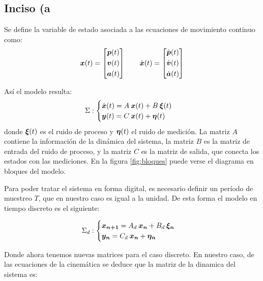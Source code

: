 \subsection{Inciso (a}
	Se define la variable de estado asociada a las ecuaciones de movimiento continuo como:
		\begin{equation*}
			\vect{x}(t) = \begin{bmatrix} \vect{p}(t) \\[0.3em] \vect{v}(t) \\[0.3em] \vect{a}(t) \end{bmatrix} \qquad%
			\dot{\vect{x}}(t) = \begin{bmatrix} \dot{\vect{p}}(t) \\[0.3em] \dot{\vect{v}}(t) \\[0.3em] \dot{\vect{a}}(t) \end{bmatrix}
		\end{equation*}

	Así el modelo resulta:
		\begin{equation*}
			\Sigma:
			\begin{cases}
				\dot{\boldsymbol{x}}(t) = A\: \boldsymbol{x}(t) + B \: \boldsymbol{\xi}(t) \\
				\boldsymbol{y}(t) = C\: \boldsymbol{x}(t) + \boldsymbol{\eta}(t)
			\end{cases}
		\end{equation*}
	donde $\boldsymbol{\xi}(t)$ es el ruido de proceso y $\boldsymbol{\eta}(t)$ el ruido de medición. La matriz $A$ contiene la información de la dinámica del sistema, la matriz $B$ es la matriz de entrada del ruido de proceso, y la matriz $C$ es la matriz de salida, que conecta los estados con las mediciones. En la figura \ref{fig:bloques} puede verse el diagrama en bloques del modelo.
	
	Para poder tratar el sistema en forma digital, es necesario definir un período de muestreo $T$, que en nuestro caso es igual a la unidad. De esta forma el modelo en tiempo discreto es el siguiente:
	
		\begin{equation*}
			\Sigma_{d}:
			\begin{cases}
				\boldsymbol{x_{n + 1}} = A_{d}\: \boldsymbol{x_{n}} + B_{d} \: \boldsymbol{\xi_{n}} \\
				\boldsymbol{y_{n}} = C_{d}\: \boldsymbol{x_{n}} + \boldsymbol{\eta_{n}}
			\end{cases}
		\end{equation*}
		
	Donde ahora tenemos nuevas matrices para el caso discreto. En nuestro caso, de las ecuaciones de la cinemática se deduce que la matriz de la dinamica del sistema es:

